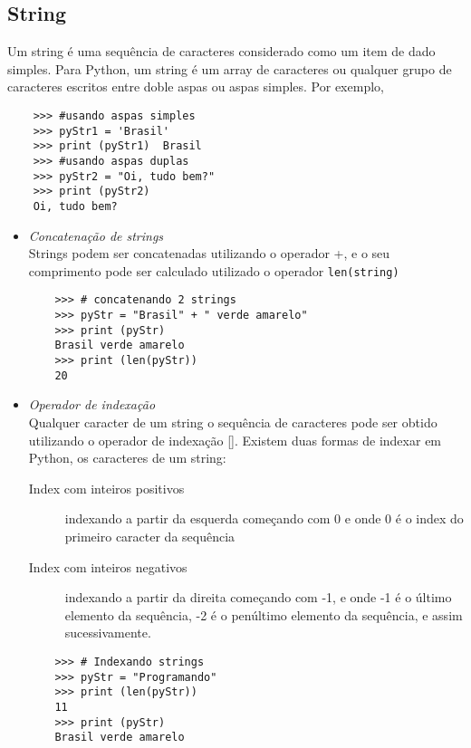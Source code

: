             \subsection{String}
            Um string \'{e} uma sequ\^{e}ncia de caracteres considerado como um item de dado simples. Para Python, um string \'{e} um array de caracteres ou qualquer grupo de caracteres escritos entre doble aspas ou aspas simples. Por exemplo,
    \begin{lstlisting}
    >>> #usando aspas simples
    >>> pyStr1 = 'Brasil'
    >>> print (pyStr1)  Brasil
    >>> #usando aspas duplas
    >>> pyStr2 = "Oi, tudo bem?"
    >>> print (pyStr2)
    Oi, tudo bem?
    \end{lstlisting}

    \begin{itemize}
      \item \textit{Concatena\c{c}\~{a}o de strings}\\
            Strings podem ser concatenadas utilizando o operador +, e o seu comprimento pode ser calculado utilizado o operador \texttt{len(string)}
     \begin{lstlisting}
    >>> # concatenando 2 strings
    >>> pyStr = "Brasil" + " verde amarelo"
    >>> print (pyStr)
    Brasil verde amarelo
    >>> print (len(pyStr))
    20
    \end{lstlisting}

      \item \textit{Operador de indexa\c{c}\~{a}o}\\
      Qualquer caracter de um string o sequ\^{e}ncia de caracteres pode ser obtido utilizando o operador de indexa\c{c}\~{a}o []. Existem duas formas de indexar em Python, os caracteres de um string:\\
      \begin{description}
        \item[Index com inteiros positivos] indexando a partir da esquerda come\c{c}ando com 0 e  onde 0 \'{e} o index do primeiro caracter da sequ\^{e}ncia
        \item[Index com inteiros negativos] indexando a partir da direita come\c{c}ando com -1, e onde -1 \'{e} o \'{u}ltimo elemento da sequ\^{e}ncia, -2 \'{e} o pen\'{u}ltimo elemento da sequ\^{e}ncia, e assim sucessivamente.
      \end{description}

     \begin{lstlisting}
    >>> # Indexando strings
    >>> pyStr = "Programando"
    >>> print (len(pyStr))
    11
    >>> print (pyStr)
    Brasil verde amarelo
        \end{lstlisting}





\end{itemize}
